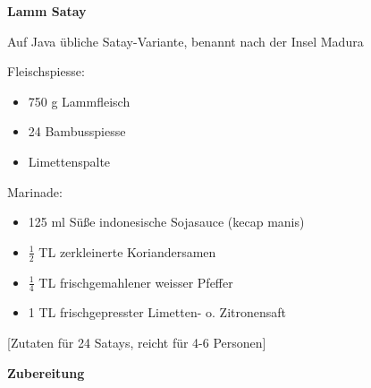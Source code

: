 
\parindent0pt	

\pagestyle{empty}


\textbf{{\LARGE Lamm Satay}}%

\hrulefill

Auf Java übliche Satay-Variante, benannt nach der Insel Madura 
\vspace*{\fill}
\begin{multicols}{2}	
Fleischspiesse:
\begin{itemize}
\item 750 g Lammfleisch %
\item 24 Bambusspiesse%
\item Limettenspalte %
\end{itemize}
\vfill
\columnbreak
Marinade:
\begin{itemize}
\item 125 ml Süße indonesische Sojasauce (kecap manis)%
\item $\frac{1}{2}$ TL zerkleinerte Koriandersamen %
\item $\frac{1}{4}$ TL frischgemahlener weisser Pfeffer%
\item 1 TL frischgepresster Limetten- o. Zitronensaft%
\end{itemize}
\end{multicols}

\vspace{5mm}
\begin{center}
[Zutaten für 24 Satays, reicht für 4-6 Personen]
\end{center}

\vfill
\newpage
\textbf{{\LARGE Zubereitung}}%

\hrulefill

